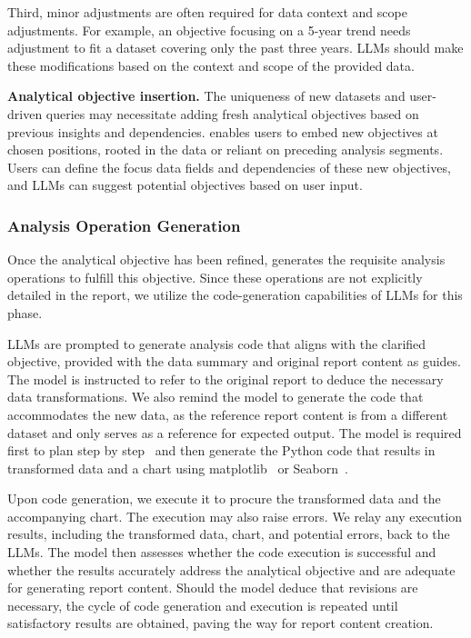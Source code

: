 Third, minor adjustments are often required for data context and scope adjustments. 
For example, an objective focusing on a 5-year trend needs adjustment to fit a dataset covering only the past three years. 
LLMs should make these modifications based on the context and scope of the provided data.

\textbf{Analytical objective insertion. }
The uniqueness of new datasets and user-driven queries may necessitate adding fresh analytical objectives based on previous insights and dependencies. 
\system{} enables users to embed new objectives at chosen positions, rooted in the data or reliant on preceding analysis segments. 
Users can define the focus data fields and dependencies of these new objectives, and LLMs can suggest potential objectives based on user input.

\subsubsection{Analysis Operation Generation}

Once the analytical objective has been refined, \system{} generates the requisite analysis operations to fulfill this objective. 
Since these operations are not explicitly detailed in the report, we utilize the code-generation capabilities of LLMs for this phase. 

LLMs are prompted to generate analysis code that aligns with the clarified objective, provided with the data summary and original report content as guides. 
The model is instructed to refer to the original report to deduce the necessary data transformations. 
We also remind the model to generate the code that accommodates the new data, as the reference report content is from a different dataset and only serves as a reference for expected output. 
The model is required first to plan step by step~\cite{kojima2022large} and then generate the Python code that results in transformed data and a chart using matplotlib~\cite{Hunter2007matplotlib} or Seaborn~\cite{Waskom2021seaborn}. 

Upon code generation, we execute it to procure the transformed data and the accompanying chart. 
The execution may also raise errors. 
We relay any execution results, including the transformed data, chart, and potential errors, back to the LLMs. 
The model then assesses whether the code execution is successful and whether the results accurately address the analytical objective and are adequate for generating report content. 
Should the model deduce that revisions are necessary, the cycle of code generation and execution is repeated until satisfactory results are obtained, paving the way for report content creation.

